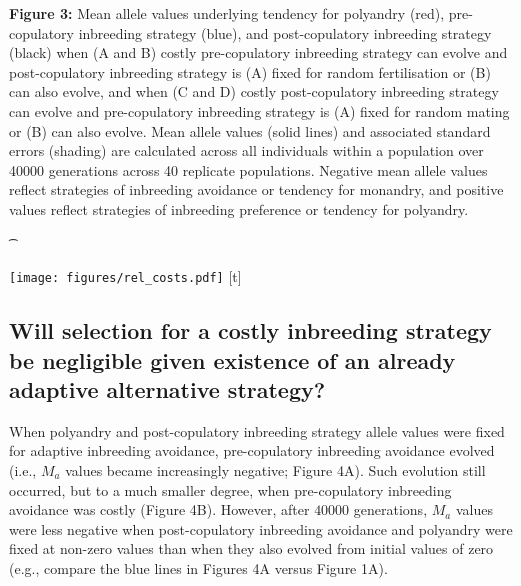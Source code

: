 \documentclass[10pt,letterpaper]{article}
\begin{document}
{\color{Gray}
\begin{adjustwidth}{-2.2in}{0in}
{%
   \begin{justify}\vspace{0.25 mm} \textbf{Figure 3:} Mean allele values underlying tendency for polyandry (red), pre-copulatory inbreeding strategy (blue), and post-copulatory inbreeding strategy (black) when (A and B) costly pre-copulatory inbreeding strategy can evolve and post-copulatory inbreeding strategy is (A) fixed for random fertilisation or (B) can also evolve, and when (C and D) costly post-copulatory inbreeding strategy can evolve and pre-copulatory inbreeding strategy is (A) fixed for random mating or (B) can also evolve. Mean allele values (solid lines) and associated standard errors (shading) are calculated across all individuals within a population over 40000 generations across 40 replicate populations. Negative mean allele values reflect strategies of inbreeding avoidance or tendency for monandry, and positive values reflect strategies of inbreeding preference or tendency for polyandry.\end{justify}{\t}%
}
{%
   \texttt{[image: figures/rel\_costs.pdf]}%
}%
[t]
\end{adjustwidth}
}

\subsection*{Will selection for a costly inbreeding strategy be negligible given existence of an already adaptive alternative strategy?}

When polyandry and post-copulatory inbreeding strategy allele values were fixed for adaptive inbreeding avoidance, pre-copulatory inbreeding avoidance evolved (i.e., $M_{a}$ values became increasingly negative; Figure 4A). Such evolution still occurred, but to a much smaller degree, when pre-copulatory inbreeding avoidance was costly (Figure 4B). However, after $40000$ generations, $M_{a}$ values were less negative when post-copulatory inbreeding avoidance and polyandry were fixed at non-zero values than when they also evolved from initial values of zero (e.g., compare the blue lines in Figures 4A versus Figure 1A).
\end{document}
